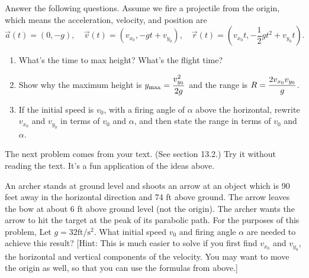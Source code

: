 \begin{problem}%
 Answer the following questions. Assume we fire a projectile from the origin, which means the acceleration, velocity, and position are 
$$ \vec a(t) = (0,-g),\quad 
\vec v(t) = (v_{x_0}, -gt+ v_{y_0}),\quad
\vec r(t) = (v_{x_0}t, -\frac12 gt^2+ v_{y_0}t)
.$$
\begin{enumerate}
 \item What's the time to max height?  What's the flight time? 
 \item Show why the maximum height is $\displaystyle y_{\max}=\frac{v_{y_0}^2}{2g}$ and the range is $\displaystyle R=\frac{2v_{x_0}v_{y_0}}{g}$.
 \item If the initial speed is $v_0$, with a firing angle of $\alpha$ above the horizontal, rewrite $v_{x_0}$ and $v_{y_0}$ in terms of $v_0$ and $\alpha$, and then state the range in terms of $v_0$ and $\alpha$. 
\end{enumerate}
\end{problem}

The next problem comes from your text. (See section 13.2.)  Try it without reading the text.  It's a fun application of the ideas above.
\begin{problem}%
 An archer stands at ground level and shoots an arrow at an object which is 90 feet away in the horizontal direction and 74 ft above ground. The arrow leaves the bow at about 6 ft above ground level (not the origin). 
 The archer wants the arrow to hit the target at the peak of its parabolic path. 
 For the purposes of this problem, Let $g = 32 \text{ft}/\text{s}^2$. 
 What initial speed $v_0$ and firing angle $\alpha$ are needed to achieve this result? 
 [Hint: This is much easier to solve if you first find $v_{x_0}$ and $v_{y_0}$, the horizontal and vertical components of the velocity. You may want to move the origin as well, so that you can use the formulas from above.]
\end{problem}

